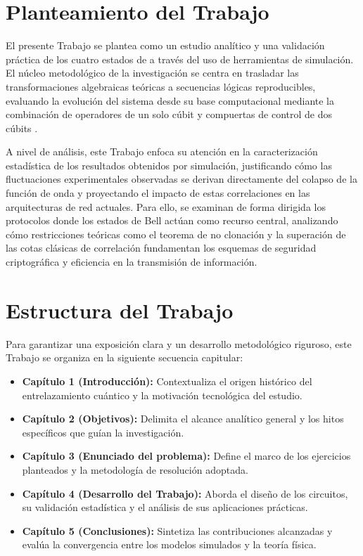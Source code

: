 \documentclass[11pt,a4paper,spanish]{book}
\begin{document}
\section{Planteamiento del Trabajo}
El presente Trabajo se plantea como un estudio analítico y una validación práctica de los cuatro estados de \cite{bell1964} a través del uso de herramientas de simulación. El núcleo metodológico de la investigación se centra en trasladar las transformaciones algebraicas teóricas a secuencias lógicas reproducibles, evaluando la evolución del sistema desde su base computacional mediante la combinación de operadores de un solo cúbit \citep{deutsch1992} y compuertas de control de dos cúbits \citep{barenco1995}.

A nivel de análisis, este Trabajo enfoca su atención en la caracterización estadística de los resultados obtenidos por simulación, justificando cómo las fluctuaciones experimentales observadas se derivan directamente del colapso de la función de onda \citep{nielsen2010} y proyectando el impacto de estas correlaciones en las arquitecturas de red actuales. Para ello, se examinan de forma dirigida los protocolos donde los estados de Bell actúan como recurso central, analizando cómo restricciones teóricas como el teorema de no clonación \citep{wootters1982} y la superación de las cotas clásicas de correlación fundamentan los esquemas de seguridad criptográfica y eficiencia en la transmisión de información.

\section{Estructura del Trabajo}
Para garantizar una exposición clara y un desarrollo metodológico riguroso, este Trabajo se organiza en la siguiente secuencia capitular:

\begin{itemize}
    \item \textbf{Capítulo 1 (Introducción):} Contextualiza el origen histórico del entrelazamiento cuántico y la motivación tecnológica del estudio.
    \item \textbf{Capítulo 2 (Objetivos):} Delimita el alcance analítico general y los hitos específicos que guían la investigación.
    \item \textbf{Capítulo 3 (Enunciado del problema):} Define el marco de los ejercicios planteados y la metodología de resolución adoptada.
    \item \textbf{Capítulo 4 (Desarrollo del Trabajo):} Aborda el diseño de los circuitos, su validación estadística y el análisis de sus aplicaciones prácticas.
    \item \textbf{Capítulo 5 (Conclusiones):} Sintetiza las contribuciones alcanzadas y evalúa la convergencia entre los modelos simulados y la teoría física.
\end{itemize}
\end{document}
